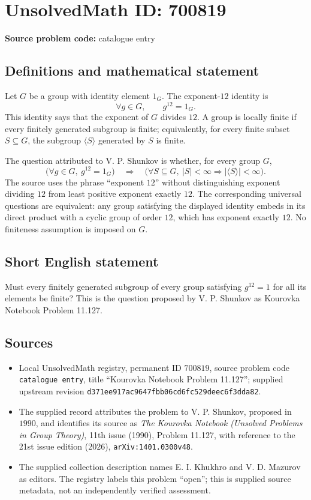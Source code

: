 \documentclass[11pt]{article}
\begin{document}
\section*{UnsolvedMath ID: 700819}
\textbf{Source problem code:} catalogue entry
\subsection{Definitions and mathematical statement}
Let \(G\) be a group with identity element \(1_G\). The exponent-\(12\) identity is
\[
\forall g\in G,\qquad g^{12}=1_G.
\]
This identity says that the exponent of \(G\) divides \(12\). A group is locally finite if every finitely generated subgroup is finite; equivalently, for every finite subset \(S\subseteq G\), the subgroup \(\langle S\rangle\) generated by \(S\) is finite.

The question attributed to V. P. Shunkov is whether, for every group \(G\),
\[
\bigl(\forall g\in G,\ g^{12}=1_G\bigr)
\quad\Longrightarrow\quad
\bigl(\forall S\subseteq G,\ |S|<\infty\Longrightarrow |\langle S\rangle|<\infty\bigr).
\]
The source uses the phrase ``exponent \(12\)'' without distinguishing exponent dividing \(12\) from least positive exponent exactly \(12\). The corresponding universal questions are equivalent: any group satisfying the displayed identity embeds in its direct product with a cyclic group of order \(12\), which has exponent exactly \(12\). No finiteness assumption is imposed on \(G\).
\subsection{Short English statement}
Must every finitely generated subgroup of every group satisfying \(g^{12}=1\) for all its elements be finite? This is the question proposed by V. P. Shunkov as Kourovka Notebook Problem 11.127.
\subsection{Sources}
\begin{itemize}
\item Local UnsolvedMath registry, permanent ID \(700819\), source problem code \texttt{catalogue entry}, title ``Kourovka Notebook Problem 11.127''; supplied upstream revision \texttt{d371ee917ac9647fbb06cd6fc529deec6f3dda82}.
\item The supplied record attributes the problem to V. P. Shunkov, proposed in \(1990\), and identifies its source as \emph{The Kourovka Notebook (Unsolved Problems in Group Theory)}, 11th issue (1990), Problem 11.127, with reference to the 21st issue edition (2026), \texttt{arXiv:1401.0300v48}.
\item The supplied collection description names E. I. Khukhro and V. D. Mazurov as editors. The registry labels this problem ``open''; this is supplied source metadata, not an independently verified assessment.
\end{itemize}
\end{document}
